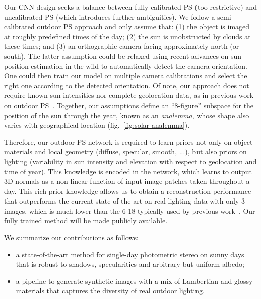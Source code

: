 Our CNN design seeks a balance between fully-calibrated PS (too restrictive) and uncalibrated PS (which introduces further ambiguities). We follow a semi-calibrated outdoor PS approach and only assume that: (1) the object is imaged at roughly predefined times of the day; (2) the sun is unobstructed by clouds at these times; and (3) an orthographic camera facing approximately north (or south). The latter assumption could be relaxed using recent advances on sun position estimation in the wild to automatically detect the camera orientation. One could then train our model on multiple camera calibrations and select the right one according to the detected orientation. Of note, our approach does not require known sun intensities nor complete geolocation data, as in previous work on outdoor PS~\cite{jung-cvpr-15}. Together, our assumptions define an ``8-figure'' subspace for the position of the sun through the year, known as an {\em analemma}, whose shape also varies with geographical location (fig.~\ref{fig:solar-analemma}).



Therefore, our outdoor PS network is required to learn priors not only on object materials and local geometry (diffuse, specular, smooth, ...), but also priors on lighting (variability in sun intensity and elevation with respect to geolocation and time of year). This knowledge is encoded in the network, which learns to output 3D normals as a non-linear function of input image patches taken throughout a day. This rich prior knowledge allows us to obtain a reconstruction performance that outperforms the current state-of-the-art on real lighting data with only 3 images, which is much lower than the 6-18 typically used by previous work~\cite{yu-iccp-13,jung-cvpr-15}. Our fully trained method will be made publicly available.



We summarize our contributions as follows:
\begin{itemize}[noitemsep,nolistsep]
	\item a state-of-the-art method for single-day photometric stereo on sunny days that is robust to shadows, specularities and arbitrary but uniform albedo;
    \item a pipeline to generate synthetic images with a mix of Lambertian and glossy materials that captures the diversity of real outdoor lighting.
\end{itemize}



